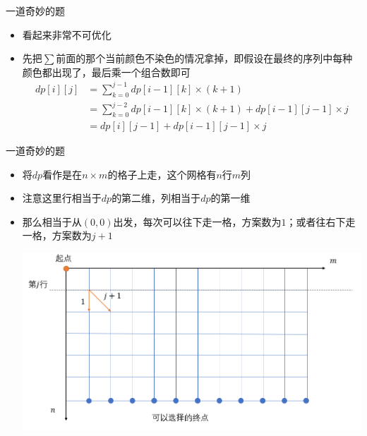\documentclass{beamer}
\begin{document}
\begin{frame}{一道奇妙的题}
    \begin{itemize}
        \item 看起来非常不可优化 \pause
        \item 先把$\sum$前面的那个当前颜色不染色的情况拿掉，即假设在最终的序列中每种颜色都出现了，最后乘一个组合数即可 \pause
        $$\begin{aligned}
            dp[i][j] &= \sum_{k = 0}^{j - 1} dp[i - 1][k]\times (k + 1)\\
            &= \sum_{k = 0}^{j - 2} dp[i - 1][k]\times (k + 1) + dp[i - 1][j - 1]\times j\\
            &= dp[i][j - 1] + dp[i - 1][j - 1] \times j
        \end{aligned}$$
    \end{itemize}
\end{frame}

\begin{frame}{一道奇妙的题}
    \begin{itemize}
        \item 将$dp$看作是在$n\times m$的格子上走，这个网格有$n$行$m$列 \pause
        \item 注意这里行相当于$dp$的第二维，列相当于$dp$的第一维 \pause
        \item 那么相当于从$(0,0)$出发，每次可以往下走一格，方案数为$1$；或者往右下走一格，方案数为$j+1$ \pause
        \begin{center}
            \includegraphics[scale = 0.25]{1.png}
        \end{center}
    \end{itemize}
\end{frame}
\end{document}
